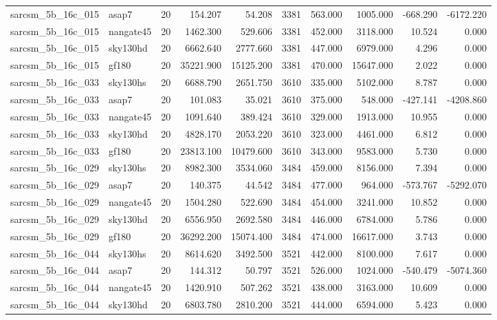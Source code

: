 \begin{longtable}{llrrrrrrrr}
sarcsm\_5b\_16c\_015 & asap7 & 20 & 154.207 & 54.208 & 3381 & 563.000 & 1005.000 & -668.290 & -6172.220 \\
sarcsm\_5b\_16c\_015 & nangate45 & 20 & 1462.300 & 529.606 & 3381 & 452.000 & 3118.000 & 10.524 & 0.000 \\
sarcsm\_5b\_16c\_015 & sky130hd & 20 & 6662.640 & 2777.660 & 3381 & 447.000 & 6979.000 & 4.296 & 0.000 \\
sarcsm\_5b\_16c\_015 & gf180 & 20 & 35221.900 & 15125.200 & 3381 & 470.000 & 15647.000 & 2.022 & 0.000 \\
sarcsm\_5b\_16c\_033 & sky130hs & 20 & 6688.790 & 2651.750 & 3610 & 335.000 & 5102.000 & 8.787 & 0.000 \\
sarcsm\_5b\_16c\_033 & asap7 & 20 & 101.083 & 35.021 & 3610 & 375.000 & 548.000 & -427.141 & -4208.860 \\
sarcsm\_5b\_16c\_033 & nangate45 & 20 & 1091.640 & 389.424 & 3610 & 329.000 & 1913.000 & 10.955 & 0.000 \\
sarcsm\_5b\_16c\_033 & sky130hd & 20 & 4828.170 & 2053.220 & 3610 & 323.000 & 4461.000 & 6.812 & 0.000 \\
sarcsm\_5b\_16c\_033 & gf180 & 20 & 23813.100 & 10479.600 & 3610 & 343.000 & 9583.000 & 5.730 & 0.000 \\
sarcsm\_5b\_16c\_029 & sky130hs & 20 & 8982.300 & 3534.060 & 3484 & 459.000 & 8156.000 & 7.394 & 0.000 \\
sarcsm\_5b\_16c\_029 & asap7 & 20 & 140.375 & 44.542 & 3484 & 477.000 & 964.000 & -573.767 & -5292.070 \\
sarcsm\_5b\_16c\_029 & nangate45 & 20 & 1504.280 & 522.690 & 3484 & 454.000 & 3241.000 & 10.852 & 0.000 \\
sarcsm\_5b\_16c\_029 & sky130hd & 20 & 6556.950 & 2692.580 & 3484 & 446.000 & 6784.000 & 5.786 & 0.000 \\
sarcsm\_5b\_16c\_029 & gf180 & 20 & 36292.200 & 15074.400 & 3484 & 474.000 & 16617.000 & 3.743 & 0.000 \\
sarcsm\_5b\_16c\_044 & sky130hs & 20 & 8614.620 & 3492.500 & 3521 & 442.000 & 8100.000 & 7.617 & 0.000 \\
sarcsm\_5b\_16c\_044 & asap7 & 20 & 144.312 & 50.797 & 3521 & 526.000 & 1024.000 & -540.479 & -5074.360 \\
sarcsm\_5b\_16c\_044 & nangate45 & 20 & 1420.910 & 507.262 & 3521 & 438.000 & 3163.000 & 10.609 & 0.000 \\
sarcsm\_5b\_16c\_044 & sky130hd & 20 & 6803.780 & 2810.200 & 3521 & 444.000 & 6594.000 & 5.423 & 0.000 \\

\end{longtable}
